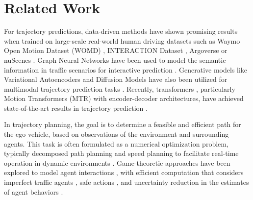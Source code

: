 \section{Related Work}


For trajectory predictions, data-driven methods have shown promising results when trained on large-scale real-world human driving datasets such as Waymo Open Motion Dataset (WOMD) \citep{ettinger2021large}, INTERACTION Dataset \citep{zhan2019interaction}, Argoverse \citep{chang2019argoverse} or nuScenes \citep{caesar2020nuscenes}.
Graph Neural Networks have been used to model the semantic information in traffic scenarios for interactive prediction \citep{hu2022scenario}.
Generative models like Variational Autoencoders and Diffusion Models have also been utilized for multimodal trajectory prediction tasks \citep{salzmann2020trajectron++,jiang2023motiondiffuser}.
Recently, transformers \citep{vaswani2017attention}, particularly Motion Transformers (MTR) \citep{shi2022motion,shi2024mtr++,li2024adaptive} with encoder-decoder architectures, have achieved state-of-the-art results in trajectory prediction \citep{waymo2024motion}.

In trajectory planning, the goal is to determine a feasible and efficient path for the ego vehicle, based on observations of the environment and surrounding agents.
This task is often formulated as a numerical optimization problem, typically decomposed path planning and speed planning to facilitate real-time operation in dynamic environments \citep{xu2012real,xu2021autonomous,anon2024multi}.
Game-theoretic approaches have been explored to model agent interactions \citep{sadigh2016planning}, with efficient computation \citep{fisac2019hierarchical} that considers imperfect traffic agents \citep{tian2021anytime}, safe actions \citep{tian2022safety}, and uncertainty reduction in the estimates of agent behaviors \citep{hu2024active}.  

